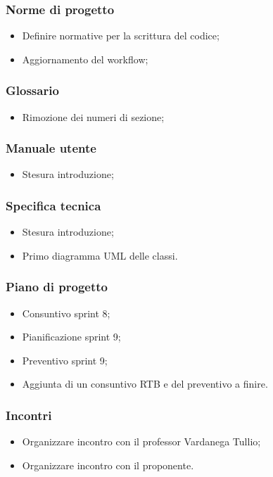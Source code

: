 \subsubsection{Norme di progetto}
\begin{itemize}
    \item Definire normative per la scrittura del codice;
    \item Aggiornamento del workflow;
\end{itemize}

\subsubsection{Glossario}
\begin{itemize}
    \item Rimozione dei numeri di sezione;
\end{itemize}

\subsubsection{Manuale utente}
\begin{itemize}
    \item Stesura introduzione;
\end{itemize}

\subsubsection{Specifica tecnica}
\begin{itemize}
    \item Stesura introduzione;
    \item Primo diagramma UML delle classi.
\end{itemize}

\subsubsection{Piano di progetto}
\begin{itemize}
    \item Consuntivo sprint 8;
    \item Pianificazione sprint 9;
    \item Preventivo sprint 9;
    \item Aggiunta di un consuntivo RTB e del preventivo a finire.
\end{itemize}

\subsubsection{Incontri}
\begin{itemize}
    \item Organizzare incontro con il professor Vardanega Tullio;
    \item Organizzare incontro con il proponente.
\end{itemize}
